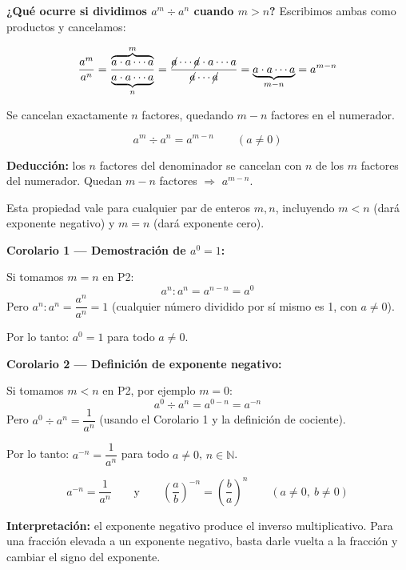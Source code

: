 \documentclass[11pt, letterpaper]{article}
\begin{document}
\textbf{¿Qué ocurre si dividimos $a^m \div a^n$ cuando $m > n$?} Escribimos ambas como productos y cancelamos:

$$\frac{a^m}{a^n} = \frac{\overbrace{a\cdot a\cdots a}^{m}}{\underbrace{a\cdot a\cdots a}_{n}} = \frac{\cancel{a}\cdots\cancel{a}\cdot a\cdots a}{\cancel{a}\cdots\cancel{a}} = \underbrace{a\cdot a\cdots a}_{m-n} = a^{m-n}$$

Se cancelan exactamente $n$ factores, quedando $m-n$ factores en el numerador.

\begin{tcolorbox}[importantbox, title={P2 — División de potencias de igual base}]
$$a^m \div a^n = a^{m-n} \qquad (a \neq 0)$$

\textbf{Deducción:} los $n$ factores del denominador se cancelan con $n$ de los $m$ factores del numerador. Quedan $m-n$ factores $\Rightarrow$ $a^{m-n}$.

Esta propiedad vale para cualquier par de enteros $m, n$, incluyendo $m < n$ (dará exponente negativo) y $m = n$ (dará exponente cero).
\end{tcolorbox}

\medskip
\textbf{Corolario 1 — Demostración de $a^0 = 1$:}

Si tomamos $m = n$ en P2:
$$a^n : a^n = a^{n-n} = a^0$$
Pero $a^n : a^n = \dfrac{a^n}{a^n} = 1$ (cualquier número dividido por sí mismo es 1, con $a\neq 0$).

Por lo tanto: $\boxed{a^0 = 1}$ \quad para todo $a \neq 0$.

\medskip
\textbf{Corolario 2 — Definición de exponente negativo:}

Si tomamos $m < n$ en P2, por ejemplo $m = 0$:
$$a^0 \div a^n = a^{0-n} = a^{-n}$$
Pero $a^0 \div a^n = \dfrac{1}{a^n}$ (usando el Corolario 1 y la definición de cociente).

Por lo tanto: $\boxed{a^{-n} = \dfrac{1}{a^n}}$ \quad para todo $a \neq 0$, $n \in \mathbb{N}$.

\begin{tcolorbox}[importantbox, title={Exponente negativo — propiedad deducida}]
$$a^{-n} = \frac{1}{a^n} \qquad\text{y}\qquad \left(\frac{a}{b}\right)^{-n} = \left(\frac{b}{a}\right)^n \qquad (a \neq 0,\ b \neq 0)$$

\textbf{Interpretación:} el exponente negativo produce el inverso multiplicativo. Para una fracción elevada a un exponente negativo, basta darle vuelta a la fracción y cambiar el signo del exponente.
\end{tcolorbox}
\end{document}

